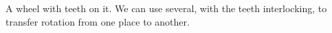 A wheel with teeth on it. We can use several,
with the teeth interlocking, to transfer
rotation from one place to another.
